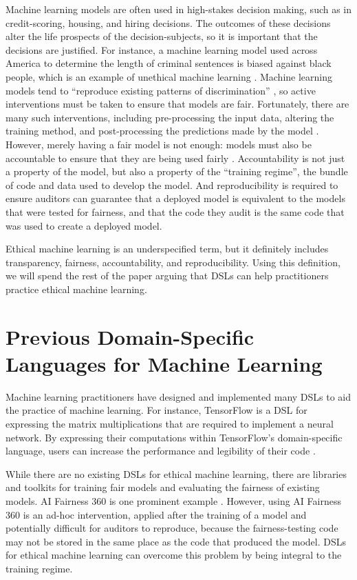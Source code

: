 \documentclass[letterpaper]{article}
\newcommand{\citep}[1]{\cite{#1}}
\begin{document}
Machine learning models are often used in high-stakes decision making, such as in credit-scoring, housing, and hiring decisions. The outcomes of these decisions alter the life prospects of the decision-subjects, so it is important that the decisions are justified. For instance, a machine learning model used across America to determine the length of criminal sentences is biased against black people, which is an example of unethical machine learning \citep{Kirchner2016}. Machine learning models tend to ``reproduce existing patterns of discrimination'' \citep{Barocas2016}, so active interventions must be taken to ensure that models are fair. Fortunately, there are many such interventions, including pre-processing the input data, altering the training method, and post-processing the predictions made by the model \cite{Bellamy2018,Hajian2016}. However, merely having a fair model is not enough: models must also be accountable to ensure that they are being used fairly \citep{Binns2018}. Accountability is not just a property of the model, but also a property of the ``training regime'', the bundle of code and data used to develop the model. And reproducibility is required to ensure auditors can guarantee that a deployed model is equivalent to the models that were tested for fairness, and that the code they audit is the same code that was used to create a deployed model. 

Ethical machine learning is an underspecified term, but it definitely includes transparency, fairness, accountability, and reproducibility. Using this definition, we will spend the rest of the paper arguing that DSLs can help practitioners practice ethical machine learning.

\section{Previous Domain-Specific Languages for Machine Learning}
Machine learning practitioners have designed and implemented many DSLs to aid the practice of machine learning. For instance, TensorFlow is a DSL for expressing the matrix multiplications that are required to implement a neural network. By expressing their computations within TensorFlow’s domain-specific language, users can increase the performance and legibility of their code \citep{Abadi2016}. 

While there are no existing DSLs for ethical machine learning, there are libraries and toolkits for training fair models and evaluating the fairness of existing models. AI Fairness 360 is one prominent example \citep{Bellamy2018}. However, using AI Fairness 360 is an ad-hoc intervention, applied after the training of a model and potentially difficult for auditors to reproduce, because the fairness-testing code may not be stored in the same place as the code that produced the model. DSLs for ethical machine learning can overcome this problem by being integral to the training regime.
\end{document}
